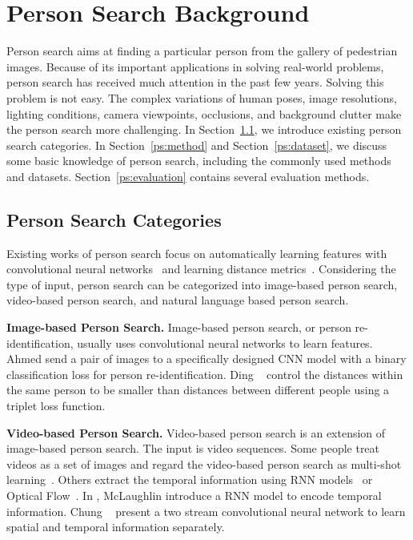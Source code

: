 \chapter{Person Search Background}
Person search aims at finding a particular person from the gallery of pedestrian images. Because of its important applications in solving real-world problems, person search has received much attention in the past few years. Solving this problem is not easy. The complex variations of human poses, image resolutions, lighting conditions, camera viewpoints, occlusions, and background clutter make the person search more challenging. In Section~\ref{ps:reid}, we introduce existing person search categories. In Section~\ref{ps:method} and Section~\ref{ps:dataset}, we discuss some basic knowledge of person search, including the commonly used methods and datasets. Section~\ref{ps:evaluation} contains several evaluation methods.

\section{Person Search Categories}
\label{ps:reid}
Existing works of person search focus on automatically learning features with convolutional neural networks~\cite{li2014deepreid,ahmed2015improved} and learning distance metrics~\cite{prosser2010person,gray2008viewpoint,liao2015efficient}. 
Considering the type of input, person search can be categorized into image-based person search, video-based person search, and natural language based person search.

\textbf{Image-based Person Search.} Image-based person search, or person re-identification, usually uses \cite{koestinger2012large,farenzena2010person,bakone,pedagadi2013local,ma2012local,xiao2017joint,kviatkovsky2013color,xiao2016end} convolutional neural networks to learn features. Ahmed \etal \cite{ahmed2015improved} send a pair of images to a specifically designed CNN model with a binary classification loss for person re-identification. 
Ding \etal~\cite{ding2015deep} control the distances within the same person to be smaller than distances between different people using a triplet loss function.

\textbf{Video-based Person Search.} Video-based person search is an extension of image-based person search. The input is video sequences. Some people treat videos as a set of images and regard the video-based person search as multi-shot learning~\cite{hamdoun2008person,prosser2008multi,li2015locality}. Others extract the temporal information using RNN models~\cite{mclaughlin2016recurrent,zhousee,li2018diversity} or Optical Flow~\cite{mclaughlin2016recurrent,chung2017two}. In \cite{mclaughlin2016recurrent}, McLaughlin \etal introduce a RNN model to encode temporal information. Chung \etal~\cite{chung2017two} present a two stream convolutional neural network to learn spatial and temporal information separately.

